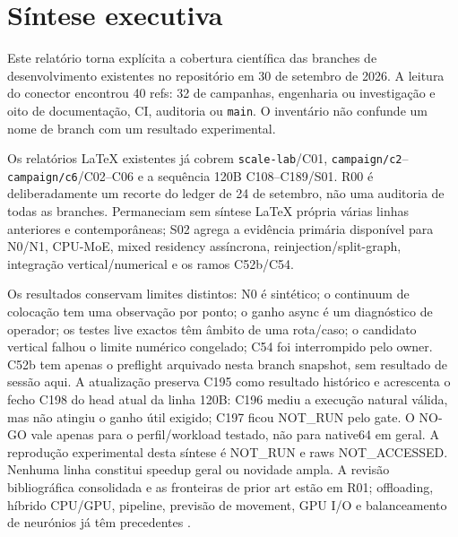 \section{Síntese executiva}

Este relatório torna explícita a cobertura científica das branches de desenvolvimento existentes no repositório em 30 de setembro de 2026. A leitura do conector encontrou 40 refs: 32 de campanhas, engenharia ou investigação e oito de documentação, CI, auditoria ou \texttt{main}. O inventário não confunde um nome de branch com um resultado experimental.

Os relatórios LaTeX existentes já cobrem \texttt{scale-lab}/C01, \texttt{campaign/c2}--\texttt{campaign/c6}/C02--C06 e a sequência 120B C108--C189/S01. R00 é deliberadamente um recorte do ledger de 24 de setembro, não uma auditoria de todas as branches. Permaneciam sem síntese LaTeX própria várias linhas anteriores e contemporâneas; S02 agrega a evidência primária disponível para N0/N1, CPU-MoE, mixed residency assíncrona, reinjection/split-graph, integração vertical/numerical e os ramos C52b/C54.

Os resultados conservam limites distintos: N0 é sintético; o continuum de colocação tem uma observação por ponto; o ganho async é um diagnóstico de operador; os testes live exactos têm âmbito de uma rota/caso; o candidato vertical falhou o limite numérico congelado; C54 foi interrompido pelo owner. C52b tem apenas o preflight arquivado nesta branch snapshot, sem resultado de sessão aqui. A atualização preserva C195 como resultado histórico e acrescenta o fecho C198 do head atual da linha 120B: C196 mediu a execução natural válida, mas não atingiu o ganho útil exigido; C197 ficou NOT\_RUN pelo gate. O NO-GO vale apenas para o perfil/workload testado, não para native64 em geral. A reprodução experimental desta síntese é NOT\_RUN e raws NOT\_ACCESSED. Nenhuma linha constitui speedup geral ou novidade ampla. A revisão bibliográfica consolidada e as fronteiras de prior art estão em R01; offloading, híbrido CPU/GPU, pipeline, previsão de movement, GPU I/O e balanceamento de neurónios já têm precedentes \cite{xue2024moeinfinity,song2024powerinfer,cao2025moelightning,fang2025klotski,zhu2026dali,yu2026patterns,chen2026copilotio,jiang2026kairox}.
